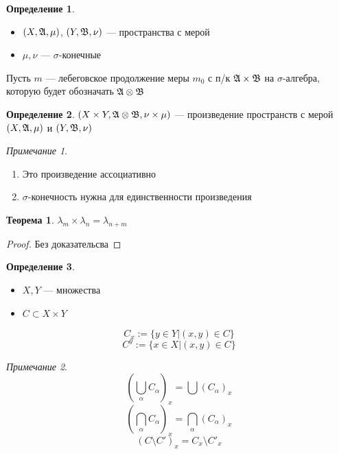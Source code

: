 \documentclass[english]{article}
\theoremstyle{plain}
\theoremstyle{remark}
\newtheorem*{remark}{Примечание}
\theoremstyle{definition}
\newtheorem{theorem}{Теорема}[section]
\newtheorem*{definition}{Определение}
\begin{document}
\begin{definition}
\-
\begin{itemize}
\item \((X, \mathfrak{A}, \mu)\), \((Y, \mathfrak{B}, \nu)\) --- пространства с мерой
\item \(\mu, \nu\) --- \(\sigma\)-конечные
\end{itemize}
Пусть \(m\) --- лебеговское продолжение меры \(m_0\) с п/к \(\mathfrak{A} \times \mathfrak{B}\) на \(\sigma\)-алгебра, которую будет обозначать \(\mathfrak{A} \otimes \mathfrak{B}\)
\end{definition}
\begin{definition}
\((X \times Y, \mathfrak{A} \otimes \mathfrak{B}, \nu \times \mu)\) --- произведение пространств с мерой \((X, \mathfrak{A}, \mu)\) и \((Y, \mathfrak{B}, \nu)\)
\end{definition}
\begin{remark}
\-
\begin{enumerate}
\item Это произведение ассоциативно
\item \(\sigma\)-конечность нужна для единственности произведения
\end{enumerate}
\end{remark}
\begin{theorem}
\(\lambda_m \times \lambda_n = \lambda_{n + m}\)
\end{theorem}
\begin{proof}
\color{red}Без доказательсва\color{black}
\end{proof}
\begin{definition}
\-
\begin{itemize}
\item \(X, Y\) --- множества
\item \(C \subset X \times Y\)
\end{itemize}
\[ C_x := \{y \in Y| (x, y) \in C\} \]
\[ C^y := \{x \in X| (x, y) \in C \} \]
\end{definition}
\begin{remark}
\[ \left(\bigcup\limits_\alpha C_\alpha\right)_x = \bigcup\left(C_\alpha\right)_x \]
\[ \left(\bigcap\limits_\alpha C_\alpha\right)_x = \bigcap\limits_\alpha\left(C_\alpha\right)_x \]
\[ \left(C \setminus C'\right)_x = C_x \setminus C'_x \]
\end{remark}
\end{document}
